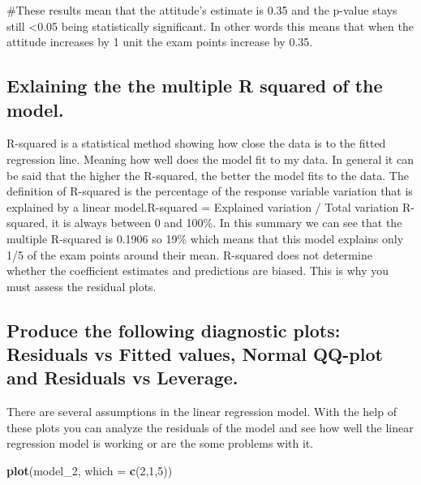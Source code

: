 \documentclass[]{article}
\newenvironment{Shaded}{\begin{snugshade}}{\end{snugshade}}
\newcommand{\DataTypeTok}[1]{\textcolor[rgb]{0.13,0.29,0.53}{#1}}
\newcommand{\DecValTok}[1]{\textcolor[rgb]{0.00,0.00,0.81}{#1}}
\newcommand{\KeywordTok}[1]{\textcolor[rgb]{0.13,0.29,0.53}{\textbf{#1}}}
\newcommand{\NormalTok}[1]{#1}
\begin{document}
\#These results mean that the attitude's estimate is 0.35 and the
p-value stays still \textless{}0.05 being statistically significant. In
other words this means that when the attitude increases by 1 unit the
exam points increase by 0.35.

\hypertarget{exlaining-the-the-multiple-r-squared-of-the-model.}{%
\subsection{Exlaining the the multiple R squared of the
model.}\label{exlaining-the-the-multiple-r-squared-of-the-model.}}

R-squared is a statistical method showing how close the data is to the
fitted regression line. Meaning how well does the model fit to my data.
In general it can be said that the higher the R-squared, the better the
model fits to the data. The definition of R-squared is the percentage of
the response variable variation that is explained by a linear
model.R-squared = Explained variation / Total variation R-squared, it is
always between 0 and 100\%. In this summary we can see that the multiple
R-squared is 0.1906 so 19\% which means that this model explains only
1/5 of the exam points around their mean. R-squared does not determine
whether the coefficient estimates and predictions are biased. This is
why you must assess the residual plots.

\hypertarget{produce-the-following-diagnostic-plots-residuals-vs-fitted-values-normal-qq-plot-and-residuals-vs-leverage.}{%
\subsection{Produce the following diagnostic plots: Residuals vs Fitted
values, Normal QQ-plot and Residuals vs
Leverage.}\label{produce-the-following-diagnostic-plots-residuals-vs-fitted-values-normal-qq-plot-and-residuals-vs-leverage.}}

There are several assumptions in the linear regression model. With the
help of these plots you can analyze the residuals of the model and see
how well the linear regression model is working or are the some problems
with it.

\begin{Shaded}
\begin{Highlighting}[]
\KeywordTok{plot}\NormalTok{(model_}\DecValTok{2}\NormalTok{, }\DataTypeTok{which =} \KeywordTok{c}\NormalTok{(}\DecValTok{2}\NormalTok{,}\DecValTok{1}\NormalTok{,}\DecValTok{5}\NormalTok{))}
\end{Highlighting}
\end{Shaded}
\end{document}
